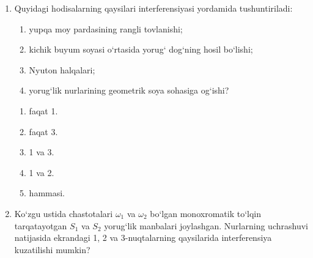 \begin{enumerate}
\item Quyidagi hodisalarning qaysilari interferensiyasi yordamida tushuntiriladi:
\begin{enumerate}
\item[1-] yupqa moy pardasining rangli tovlanishi;
\item[2-] kichik buyum soyasi o‘rtasida yorug‘ dog‘ning hosil bo‘lishi;
\item[3-] Nyuton halqalari;
\item[4-] yorug‘lik nurlarining geometrik soya sohasiga og‘ishi?
\end{enumerate}
\begin{enumerate}[label=\Alph*)]
\item faqat 1.
\item faqat 3.
\item 1 va 3.
\item 1 va 2.
\item hammasi.
\end{enumerate}

\item Ko‘zgu ustida chastotalari $\omega_1$ va $\omega_2$ bo‘lgan monoxromatik to‘lqin tarqatayotgan $S_1$ va $S_2$ yorug‘lik manbalari joylashgan. Nurlarning uchrashuvi natijasida ekrandagi 1, 2 va 3-nuqtalarning qaysilarida interferensiya kuzatilishi mumkin?

\end{enumerate}
